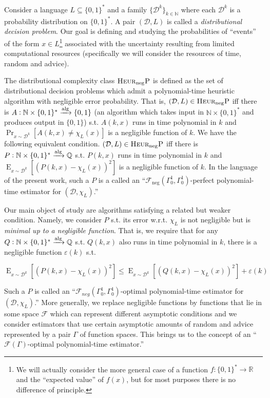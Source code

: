 \documentclass{article}
\numberwithin{equation}{section}
\theoremstyle{definition}
\theoremstyle{plain}
\newcommand{\Bool}{\{0,1\}}
\newcommand{\Words}{{\Bool^*}}
\DeclareMathOperator{\Prb}{Pr}
\DeclareMathOperator{\E}{E}
\newcommand{\Nats}{\mathbb{N}}
\newcommand{\Rats}{\mathbb{Q}}
\newcommand{\Reals}{\mathbb{R}}
\newcommand{\Dist}{\mathcal{D}}
\newcommand{\Fall}{\mathcal{F}}
\newcommand{\EG}{\Fall(\Gamma)}
\newcommand{\Alg}{\xrightarrow{\textnormal{alg}}}
\begin{document}
Consider a language ${L \subseteq \Words}$ and a family ${\{\Dist^k\}}_{k \in \Nats}$ where each ${\Dist^k}$ is a probability distribution on ${\Words}$. A pair ${(\Dist,L)}$ is called a \emph{distributional decision problem}\cite{Bogdanov_2006}. Our goal is defining and studying the probabilities of \enquote{events} of the form ${x \in L}$\footnote{We will actually consider the more general case of a function ${f: \Words \rightarrow \Reals}$ and the \enquote{expected value} of ${f(x)}$, but for most purposes there is no difference of principle.}  associated with the uncertainty resulting from limited computational resources (specifically we will consider the resources of time, random and advice).

The distributional complexity class ${\textsc{Heur}_{\textnormal{neg}}\textsc{P}}$ is defined as the set of distributional decision problems which admit a polynomial-time heuristic algorithm with negligible error probability\cite{Bogdanov_2006}. That is, ${(\Dist, L) \in \textsc{Heur}_{\textnormal{neg}}\textsc{P}}$ iff there is ${A: \Nats \times \Words \Alg \Bool}$ (an algorithm which takes input in ${\Nats \times \Words}$ and produces output in ${\Bool}$) s.t. ${A(k,x)}$ runs in time polynomial in ${k}$ and ${\Prb_{x \sim \Dist^k}[A(k,x) \ne \chi_L(x)]}$ is a negligible function of ${k}$. We have the following equivalent condition. ${(\Dist, L) \in \textsc{Heur}_{\textnormal{neg}}\textsc{P}}$ iff there is ${P: \Nats \times \Words \Alg \Rats}$ s.t. ${P(k,x)}$ runs in time polynomial in ${k}$ and ${\E_{x \sim \Dist^k}[(P(k,x)-\chi_L(x))^2]}$ is a negligible function of ${k}$. In the language of the present work, such a ${P}$ is a called an \enquote{${\Fall_{\text{neg}}(\Gamma_0^1, \Gamma_0^1)}$-perfect polynomial-time estimator for ${(\Dist,\chi_L)}$.}

Our main object of study are algorithms satisfying a related but weaker condition. Namely, we consider ${P}$ s.t. its error w.r.t. ${\chi_L}$ is not negligible but is \emph{minimal up to a negligible function}. That is, we require that for any ${Q: \Nats \times \Words \Alg \Rats}$ s.t. ${Q(k,x)}$ also runs in time polynomial in ${k}$, there is a negligible function ${\varepsilon(k)}$ s.t. 

\[\E_{x \sim \Dist^k}[(P(k,x)-\chi_L(x))^2] \leq \E_{x \sim \Dist^k}[(Q(k,x)-\chi_L(x))^2] + \varepsilon(k)\]

Such a ${P}$ is called an \enquote{${\Fall_{neg}(\Gamma_0^1,\Gamma_0^1)}$-optimal polynomial-time estimator for ${(\Dist,\chi_L)}$.} More generally, we replace negligible functions by functions that lie in some space ${\Fall}$ which can represent different asymptotic conditions and we consider estimators that use certain asymptotic amounts of random and advice represented by a pair ${\Gamma}$ of function spaces. This brings us to the concept of an \enquote{${\EG}$-optimal polynomial-time estimator.}
\end{document}
